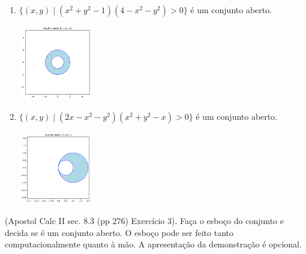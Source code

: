 \documentclass[../main.tex]{subfiles}
\begin{document}
\begin{solucao}
\begin{enumerate}[label=\alph*)]
\begin{center}
				\end{center}
				\item $\{(x,y) \mid (x^2+y^2-1)(4-x^2-y^2)>0\}$ é um conjunto aberto.
				\begin{center}
				\includegraphics[width=0.25\textwidth]{imagens/lista03/picture_lista03.02_q01_item13.png}
				\end{center}
				\item $\{(x,y) \mid (2x-x^2-y^2)(x^2+y^2-x)>0\}$ é um conjunto aberto.
				\begin{center}
				\includegraphics[width=0.25\textwidth]{imagens/lista03/picture_lista03.02_q01_item14.png}
				\end{center}
			\end{enumerate}
		\end{solucao}
		
		\begin{exercicio}{2}
			(Apostol Calc II sec. 8.3 (pp 276) Exercício 3).
			Faça o esboço do conjunto e decida se é um conjunto aberto. O esboço pode ser feito tanto computacionalmente quanto à mão. A apresentação da demonstração é opcional.
		\end{exercicio}
		
\end{document}
